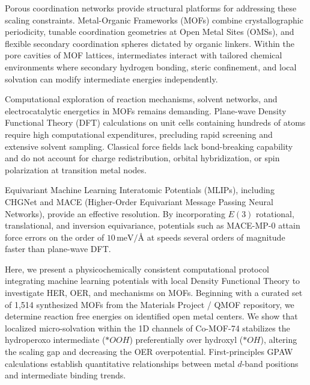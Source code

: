 \documentclass[journal=jacsat,manuscript=article]{achemso}
\begin{document}
Porous coordination networks provide structural platforms for addressing these scaling constraints.\cite{furukawa2013chemistry, cornell2020metal} Metal-Organic Frameworks (MOFs) combine crystallographic periodicity, tunable coordination geometries at Open Metal Sites (OMSs), and flexible secondary coordination spheres dictated by organic linkers.\cite{kajiwara2011organometallic, zhao2018metal} Within the pore cavities of MOF lattices, intermediates interact with tailored chemical environments where secondary hydrogen bonding, steric confinement, and local solvation can modify intermediate energies independently.\cite{koper2013theory, su2023breaking}

Computational exploration of reaction mechanisms, solvent networks, and electrocatalytic energetics in MOFs remains demanding. Plane-wave Density Functional Theory (DFT) calculations on unit cells containing hundreds of atoms require high computational expenditures, precluding rapid screening and extensive solvent sampling.\cite{rosen2021machine} Classical force fields lack bond-breaking capability and do not account for charge redistribution, orbital hybridization, or spin polarization at transition metal nodes.\cite{batatia2022mace}

Equivariant Machine Learning Interatomic Potentials (MLIPs), including CHGNet\cite{deng2023chgnet} and MACE (Higher-Order Equivariant Message Passing Neural Networks),\cite{batatia2022mace, batatia2022design} provide an effective resolution. By incorporating $E(3)$ rotational, translational, and inversion equivariance, potentials such as MACE-MP-0 attain force errors on the order of $10\,\text{meV/\AA}$ at speeds several orders of magnitude faster than plane-wave DFT.\cite{batatia2022mace}

Here, we present a physicochemically consistent computational protocol integrating machine learning potentials with local Density Functional Theory to investigate HER, OER, and  mechanisms on MOFs. Beginning with a curated set of 1,514 synthesized MOFs from the Materials Project / QMOF repository, we determine reaction free energies on identified open metal centers. We show that localized micro-solvation within the 1D channels of Co-MOF-74 stabilizes the hydroperoxo intermediate ($*OOH$) preferentially over hydroxyl ($*OH$), altering the scaling gap and decreasing the OER overpotential. First-principles GPAW calculations establish quantitative relationships between metal $d$-band positions and intermediate binding trends.
\end{document}
